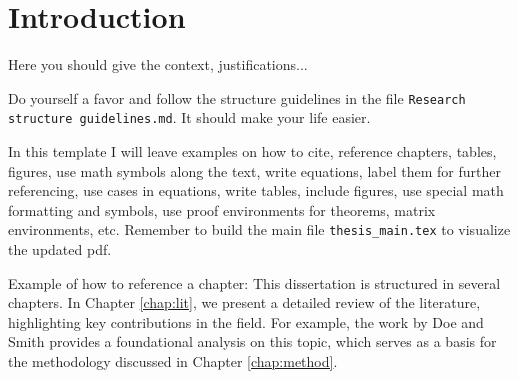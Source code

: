 \chapter{Introduction} \label{chap:intro}

Here you should give the context, justifications...

Do yourself a favor and follow the structure guidelines in the file \texttt{Research struc\-ture guidelines.md}. It should make your life easier.

In this template I will leave examples on how to cite, reference chapters, tables, figures, use math symbols along the text, write equations, label them for further referencing, use cases in equations, write tables, include figures, use special math formatting and symbols, use proof environments for theorems, matrix environments, etc. Remember to build the main file \texttt{thesis\_main.tex} to visualize the updated pdf.

Example of how to reference a chapter: This dissertation is structured in several chapters. In Chapter \ref{chap:lit}, we present a detailed review of the literature, highlighting key contributions in the field. For example, the work by Doe and Smith \cite{doe0000} provides a foundational analysis on this topic, which serves as a basis for the methodology discussed in Chapter \ref{chap:method}.
